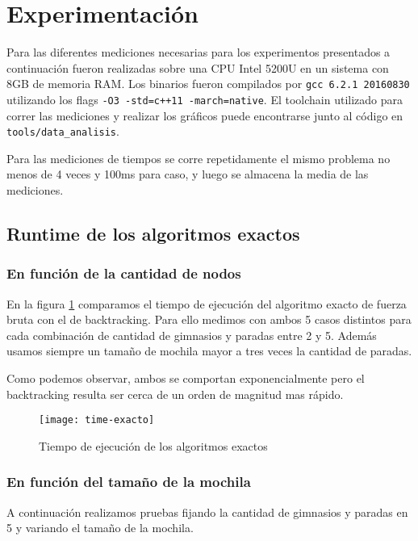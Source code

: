 \section{Experimentación}

Para las diferentes mediciones necesarias para los experimentos presentados a continuación fueron realizadas sobre una CPU Intel 5200U en un sistema con 8GB de memoria RAM. Los binarios fueron compilados por \texttt{gcc 6.2.1 20160830} utilizando los flags \texttt{-O3 -std=c++11 -march=native}. El toolchain utilizado para correr las mediciones y realizar los gráficos puede encontrarse junto al código en \texttt{tools/data_analisis}.

Para las mediciones de tiempos se corre repetidamente el mismo problema no menos de 4 veces y 100ms para caso, y luego se almacena la media de las mediciones.

\subsection{Runtime de los algoritmos exactos}

\subsubsection{En función de la cantidad de nodos}

En la figura \ref{fig:time-exacto} comparamos el tiempo de ejecución del algoritmo exacto de fuerza bruta con el de backtracking.
Para ello medimos con ambos 5 casos distintos para cada combinación de cantidad de gimnasios y paradas entre 2 y 5. Además usamos siempre un tamaño de mochila mayor a tres veces la cantidad de paradas.

Como podemos observar, ambos se comportan exponencialmente pero el backtracking resulta ser cerca de un orden de magnitud mas rápido.

\begin{figure}[H]
    \centering
    \texttt{[image: time-exacto]}
    \caption{Tiempo de ejecución de los algoritmos exactos}
    \label{fig:time-exacto}
\end{figure}

\subsubsection{En función del tamaño de la mochila}

A continuación realizamos pruebas fijando la cantidad de gimnasios y paradas en 5 y variando el tamaño de la mochila.

